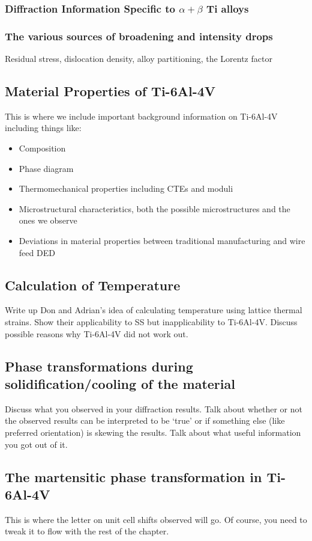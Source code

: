 \subsubsection{Diffraction Information Specific to $\alpha + \beta$ Ti alloys}


\subsubsection{The various sources of broadening and intensity drops}
Residual stress, dislocation density, alloy partitioning, the Lorentz factor

\subsection{Material Properties of Ti-6Al-4V}
This is where we include important background information on Ti-6Al-4V including things like:
\begin{itemize}
	\item Composition
	\item Phase diagram
	\item Thermomechanical properties including CTEs and moduli
	\item Microstructural characteristics, both the possible microstructures and the ones we observe
	\item Deviations in material properties between traditional manufacturing and wire feed DED
\end{itemize}

\subsection{Calculation of Temperature}
Write up Don and Adrian's idea of calculating temperature using lattice thermal strains. Show their applicability to SS but inapplicability to Ti-6Al-4V. Discuss possible reasons why Ti-6Al-4V did not work out.


\subsection{Phase transformations during solidification/cooling of the material}
Discuss what you observed in your diffraction results. Talk about whether or not the observed results can be interpreted to be `true' or if something else (like preferred orientation) is skewing the results. Talk about what useful information you got out of it.

\subsection{The martensitic phase transformation in Ti-6Al-4V}
This is where the letter on unit cell shifts observed will go. Of course, you need to tweak it to flow with the rest of the chapter. 



